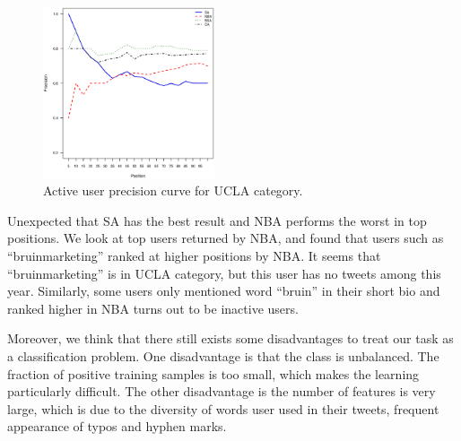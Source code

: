 \documentclass{article}
\begin{document}
\begin{figure}[h]
\centering
\includegraphics[width=0.45\textwidth]{experiment/ap.eps}
\caption{Active user precision curve for UCLA category.}
\label{fig:activeprecision}
\end{figure}

Unexpected that SA has the best result and NBA performs the worst in top positions. We look at top users returned by NBA, and found that users such as ``bruinmarketing'' ranked at higher positions by NBA. It seems that ``bruinmarketing'' is in UCLA category, but this user has no tweets among this year. Similarly, some users only mentioned word ``bruin'' in their short bio and ranked higher in NBA turns out to be inactive users.

Moreover, we think that there still exists some disadvantages to treat our task as a classification problem. One disadvantage is that the class is unbalanced. The fraction of positive training samples is too small, which makes the learning particularly difficult. The other disadvantage is the number of features is very large, which is due to the diversity of words user used in their tweets, frequent appearance of typos and hyphen marks.

\ifx \allfiles \undefined
\end{document}
